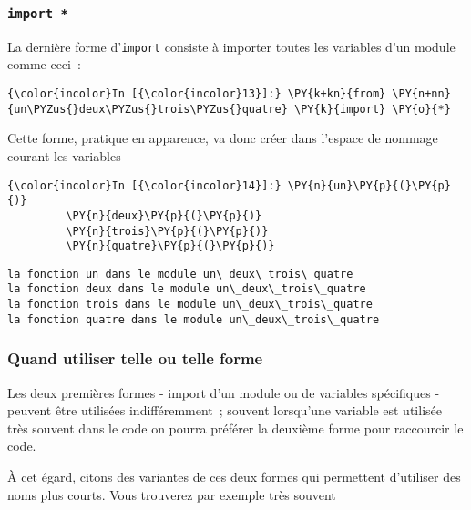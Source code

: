     \hypertarget{import}{%
\subsubsection{\texorpdfstring{\texttt{import\ *}}{import *}}\label{import}}

    La dernière forme d'\texttt{import} consiste à importer toutes les
variables d'un module comme ceci~:

    \begin{Verbatim}[commandchars=\\\{\}]
{\color{incolor}In [{\color{incolor}13}]:} \PY{k+kn}{from} \PY{n+nn}{un\PYZus{}deux\PYZus{}trois\PYZus{}quatre} \PY{k}{import} \PY{o}{*}
\end{Verbatim}


    Cette forme, pratique en apparence, va donc créer dans l'espace de
nommage courant les variables

    \begin{Verbatim}[commandchars=\\\{\}]
{\color{incolor}In [{\color{incolor}14}]:} \PY{n}{un}\PY{p}{(}\PY{p}{)}
         \PY{n}{deux}\PY{p}{(}\PY{p}{)}
         \PY{n}{trois}\PY{p}{(}\PY{p}{)}
         \PY{n}{quatre}\PY{p}{(}\PY{p}{)}
\end{Verbatim}


    \begin{Verbatim}[commandchars=\\\{\}]
la fonction un dans le module un\_deux\_trois\_quatre
la fonction deux dans le module un\_deux\_trois\_quatre
la fonction trois dans le module un\_deux\_trois\_quatre
la fonction quatre dans le module un\_deux\_trois\_quatre

    \end{Verbatim}

    \hypertarget{quand-utiliser-telle-ou-telle-forme}{%
\subsubsection{Quand utiliser telle ou telle
forme}\label{quand-utiliser-telle-ou-telle-forme}}

    Les deux premières formes - import d'un module ou de variables
spécifiques - peuvent être utilisées indifféremment~; souvent lorsqu'une
variable est utilisée très souvent dans le code on pourra préférer la
deuxième forme pour raccourcir le code.

    À cet égard, citons des variantes de ces deux formes qui permettent
d'utiliser des noms plus courts. Vous trouverez par exemple très souvent

